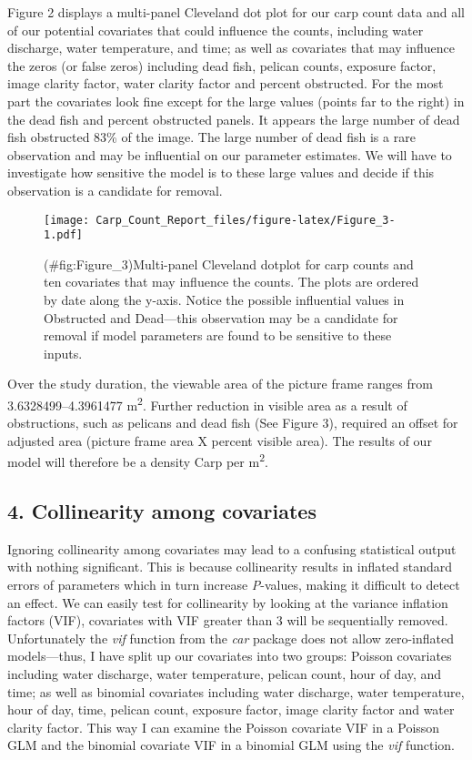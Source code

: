 \documentclass[]{article}
\begin{document}
Figure 2 displays a multi-panel Cleveland dot plot for our carp count
data and all of our potential covariates that could influence the
counts, including water discharge, water temperature, and time; as well
as covariates that may influence the zeros (or false zeros) including
dead fish, pelican counts, exposure factor, image clarity factor, water
clarity factor and percent obstructed. For the most part the covariates
look fine except for the large values (points far to the right) in the
dead fish and percent obstructed panels. It appears the large number of
dead fish obstructed 83\% of the image. The large number of dead fish is
a rare observation and may be influential on our parameter estimates. We
will have to investigate how sensitive the model is to these large
values and decide if this observation is a candidate for removal.

\begin{figure}[htbp]
\centering
\texttt{[image: Carp\_Count\_Report\_files/figure-latex/Figure\_3-1.pdf]}
\caption{(\#fig:Figure\_3)Multi-panel Cleveland dotplot for carp counts
and ten covariates that may influence the counts. The plots are ordered
by date along the y-axis. Notice the possible influential values in
Obstructed and Dead---this observation may be a candidate for removal if
model parameters are found to be sensitive to these inputs.}
\end{figure}

Over the study duration, the viewable area of the picture frame ranges
from 3.6328499--4.3961477 m\textsuperscript{2}. Further reduction in
visible area as a result of obstructions, such as pelicans and dead fish
(See Figure 3), required an offset for adjusted area (picture frame area
X percent visible area). The results of our model will therefore be a
density Carp per m\textsuperscript{2}.

\subsection{4. Collinearity among
covariates}\label{collinearity-among-covariates}

Ignoring collinearity among covariates may lead to a confusing
statistical output with nothing significant. This is because
collinearity results in inflated standard errors of parameters which in
turn increase \emph{P}-values, making it difficult to detect an effect.
We can easily test for collinearity by looking at the variance inflation
factors (VIF), covariates with VIF greater than 3 will be sequentially
removed. Unfortunately the \emph{vif} function from the \emph{car}
package does not allow zero-inflated models---thus, I have split up our
covariates into two groups: Poisson covariates including water
discharge, water temperature, pelican count, hour of day, and time; as
well as binomial covariates including water discharge, water
temperature, hour of day, time, pelican count, exposure factor, image
clarity factor and water clarity factor. This way I can examine the
Poisson covariate VIF in a Poisson GLM and the binomial covariate VIF in
a binomial GLM using the \emph{vif} function.
\end{document}
